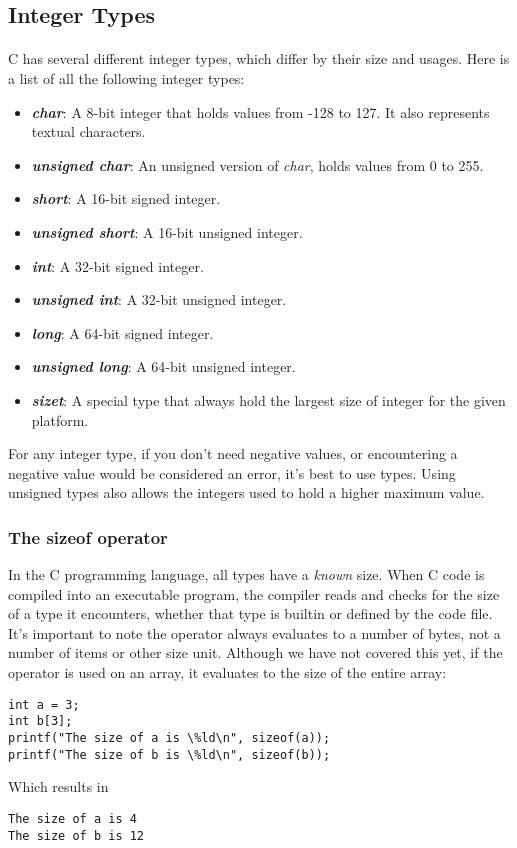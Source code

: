 \subsection{Integer Types}

\paragraph{  } C has several different integer types, which differ by their size and usages. Here is a list of all the following integer types: \\

\begin{itemize}
\item \emph{\textbf{char}}: A 8-bit integer that holds values from -128 to 127. It also represents textual characters.
\item \emph{\textbf{unsigned char}}: An unsigned version of \emph{char}, holds values from 0 to 255.
\item \emph{\textbf{short}}: A 16-bit signed integer.
\item \emph{\textbf{unsigned short}}: A 16-bit unsigned integer.
\item \emph{\textbf{int}}: A 32-bit signed integer.
\item \emph{\textbf{unsigned int}}: A 32-bit unsigned integer.
\item \emph{\textbf{long}}: A 64-bit signed integer.
\item \emph{\textbf{unsigned long}}: A 64-bit unsigned integer.
\item \emph{\textbf{size\textunderscore t}}: A special type that always hold the largest size of integer for the given platform.
\end{itemize}

\par For any integer type, if you don't need negative values, or encountering a negative value would be considered an error, it's best to use  types. Using unsigned types also allows the integers used to hold a higher maximum value.

\subsubsection{The sizeof operator}

In the C programming language, all types have a \emph{known} size.  When C code is compiled into an executable program, the compiler reads and checks for the size of a type it encounters, whether that type is builtin or defined by the code file. It's important to note the  operator always evaluates to a number of bytes, not a number of items or other size unit. Although we have not covered this yet, if the operator is used on an array, it evaluates to the size of the entire array:

\begin{lstlisting}[style=customc]
int a = 3;
int b[3];
printf("The size of a is \%ld\n", sizeof(a));
printf("The size of b is \%ld\n", sizeof(b));
\end{lstlisting}

Which results in

\begin{lstlisting}[style=customc]
The size of a is 4
The size of b is 12
\end{lstlisting}

